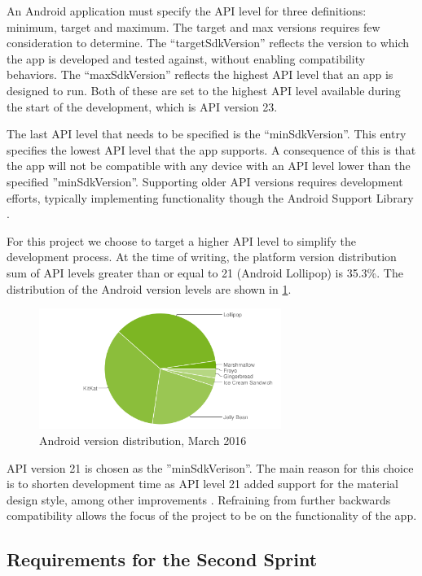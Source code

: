 An Android application must specify the API level for three definitions: minimum, target and maximum.
The target and max versions requires few consideration to determine.
The ``targetSdkVersion'' reflects the version to which the app is developed and tested against, without enabling compatibility behaviors.
The ``maxSdkVersion'' reflects the highest API level that an app is designed to run.
Both of these are set to the highest API level available during the start of the development, which is API version 23.

The last API level that needs to be specified is the ``minSdkVersion''.
This entry specifies the lowest API level that the app supports.
A consequence of this is that the app will not be compatible with any device with an API level lower than the specified ''minSdkVersion''.
Supporting older API versions requires development efforts, typically implementing functionality though the Android Support Library \cite{androidSL}.

For this project we choose to target a higher API level to simplify the development process.
At the time of writing, the platform version distribution sum of API levels greater than or equal to 21 (Android Lollipop) is 35.3\%.
The distribution of the Android version levels are shown in \ref{fig:dashboard}.

\begin{figure}[h]
	\begin{center}
	\includegraphics[width=0.7\textwidth]{figures/android-chart-march.png}
	\end{center}
	\caption{Android version distribution, March 2016 \cite{androidDashboard}}
	\label{fig:dashboard}
\end{figure}

API version 21 is chosen as the ''minSdkVerison''. 
The main reason for this choice is to shorten development time as API level 21 added support for the material design style, among other improvements \cite{android5API}. 
Refraining from further backwards compatibility allows the focus of the project to be on the functionality of the app. 






\subsection{Requirements for the Second Sprint}
